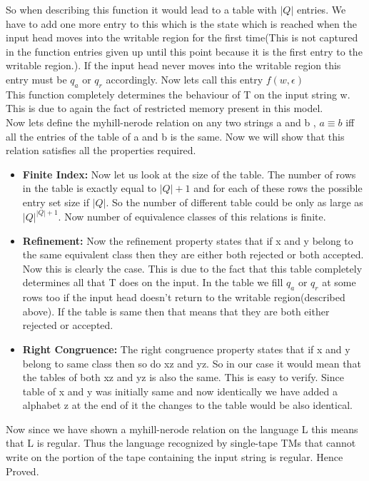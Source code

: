 \documentclass{article}
\begin{document}
So when describing this function it would lead to a table with $|Q|$ entries. We have to add one more entry to this which is the state which is reached when the input head moves into the writable region for the first time(This is not captured in the function entries given up until this point because it is the first entry to the writable region.). If the input head never moves into the writable region this entry must be $q_a$ or $q_r$ accordingly. Now lets call this entry $f(w, \epsilon)$ \\
This function completely determines the behaviour of T on the input string w. This is due to again the fact of restricted memory present in this model.\\
Now lets define the myhill-nerode relation on any two strings a and b , $a \equiv b$ iff all the entries of the table of a and b is the same. Now we will show that this relation satisfies all the properties required. 
\begin{itemize}
    \item \textbf{Finite Index:} Now let us look at the size of the table. The number of rows in the table is exactly equal to $|Q|+1$ and for each of these rows the possible entry set size if $|Q|$. So the number of different table could be only as large as ${|Q|^{|Q|+1}}$. Now number of equivalence classes of this relations is  finite.
    \item \textbf{Refinement:} Now the refinement property states that if x and y belong to the same equivalent class then they are either both rejected or both accepted. Now this is clearly the case. This is due to the fact that this table completely determines all that T does on the input. In the table we fill $q_a$ or $q_r$ at some rows too if the input head doesn't return to the writable region(described above). If the table is same then that means that they are both either rejected or accepted.
    \item \textbf{Right Congruence:} The right congruence property states that if x and y belong to same class then so do xz and yz. So in our case it would mean that the tables of both xz and yz is also the same. This is easy to verify. Since table of x and y was initially same and now identically we have added a alphabet z at the end of it the changes to the table would be also identical. 
\end{itemize}
Now since we have shown a myhill-nerode relation on the language L this means that L is regular. Thus the language recognized by single-tape TMs that cannot write on the portion of the tape containing the input string is regular. Hence Proved.
\end{document}
